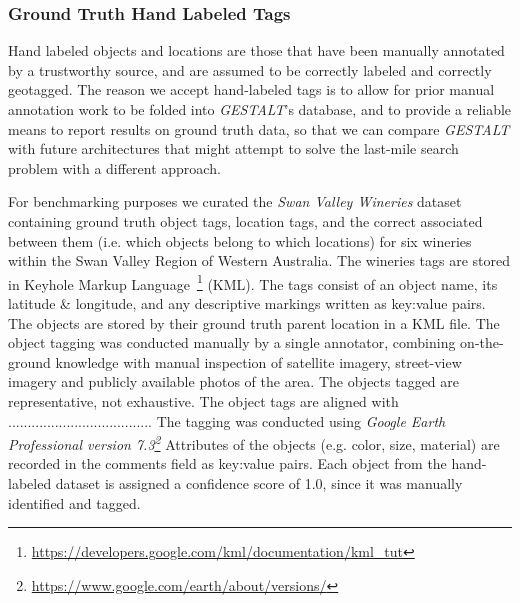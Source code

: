 \subsubsection{Ground Truth Hand Labeled Tags} 
Hand labeled objects and locations are those that have been manually annotated by a trustworthy source, and are assumed to be correctly labeled and correctly geotagged. 
The reason we accept hand-labeled tags is to allow for prior manual annotation work to be folded into \emph{GESTALT}'s database, and to provide a reliable means to report results on ground truth data, so that we can compare \emph{GESTALT} with future architectures that might attempt to solve the last-mile search problem with a different approach. 

For benchmarking purposes we curated the \emph{Swan Valley Wineries} dataset containing ground truth object tags, location tags, and the correct associated between them (i.e. which objects belong to which locations) for six wineries within the Swan Valley Region of Western Australia.
The wineries tags are stored in Keyhole Markup Language~\footnote{\href{https://developers.google.com/kml/documentation/kml_tut}{https://developers.google.com/kml/documentation/kml_tut}} (KML).
The tags consist of an object name, its latitude \& longitude, and any descriptive markings written as key:value pairs. The objects are stored by their ground truth parent location in a KML file.
The object tagging was conducted manually by a single annotator, combining on-the-ground knowledge with manual inspection of satellite imagery, street-view imagery and publicly available photos of the area. 
The objects tagged are representative, not exhaustive. 
The object tags are aligned with ..................................... 
The tagging was conducted using \textit{Google Earth Professional version 7.3\footnote{\href{https://www.google.com/earth/about/versions/}{https://www.google.com/earth/about/versions/}}}
Attributes of the objects (e.g. color, size, material) are recorded in the comments field as key:value pairs.
Each object from the hand-labeled dataset is assigned a confidence score of 1.0, since it was manually identified and tagged.



